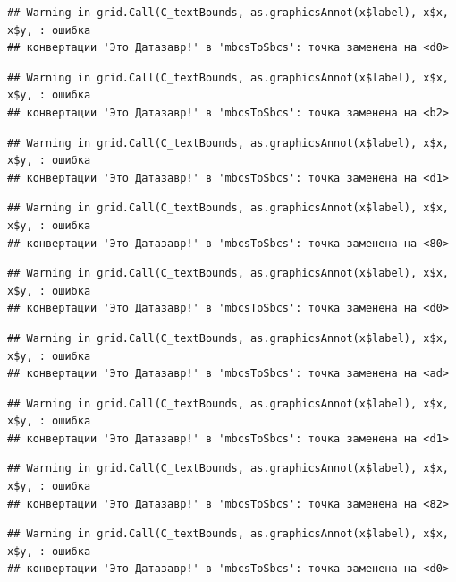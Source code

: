 \documentclass[]{book}
\begin{document}
\begin{verbatim}
## Warning in grid.Call(C_textBounds, as.graphicsAnnot(x$label), x$x, x$y, : ошибка
## конвертации 'Это Датазавр!' в 'mbcsToSbcs': точка заменена на <d0>
\end{verbatim}

\begin{verbatim}
## Warning in grid.Call(C_textBounds, as.graphicsAnnot(x$label), x$x, x$y, : ошибка
## конвертации 'Это Датазавр!' в 'mbcsToSbcs': точка заменена на <b2>
\end{verbatim}

\begin{verbatim}
## Warning in grid.Call(C_textBounds, as.graphicsAnnot(x$label), x$x, x$y, : ошибка
## конвертации 'Это Датазавр!' в 'mbcsToSbcs': точка заменена на <d1>
\end{verbatim}

\begin{verbatim}
## Warning in grid.Call(C_textBounds, as.graphicsAnnot(x$label), x$x, x$y, : ошибка
## конвертации 'Это Датазавр!' в 'mbcsToSbcs': точка заменена на <80>
\end{verbatim}

\begin{verbatim}
## Warning in grid.Call(C_textBounds, as.graphicsAnnot(x$label), x$x, x$y, : ошибка
## конвертации 'Это Датазавр!' в 'mbcsToSbcs': точка заменена на <d0>
\end{verbatim}

\begin{verbatim}
## Warning in grid.Call(C_textBounds, as.graphicsAnnot(x$label), x$x, x$y, : ошибка
## конвертации 'Это Датазавр!' в 'mbcsToSbcs': точка заменена на <ad>
\end{verbatim}

\begin{verbatim}
## Warning in grid.Call(C_textBounds, as.graphicsAnnot(x$label), x$x, x$y, : ошибка
## конвертации 'Это Датазавр!' в 'mbcsToSbcs': точка заменена на <d1>
\end{verbatim}

\begin{verbatim}
## Warning in grid.Call(C_textBounds, as.graphicsAnnot(x$label), x$x, x$y, : ошибка
## конвертации 'Это Датазавр!' в 'mbcsToSbcs': точка заменена на <82>
\end{verbatim}

\begin{verbatim}
## Warning in grid.Call(C_textBounds, as.graphicsAnnot(x$label), x$x, x$y, : ошибка
## конвертации 'Это Датазавр!' в 'mbcsToSbcs': точка заменена на <d0>
\end{verbatim}
\end{document}
